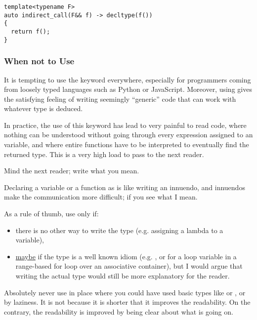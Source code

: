 \begin{lstlisting}
template<typename F>
auto indirect_call(F&& f) -> decltype(f())
{
  return f();
}
\end{lstlisting}

\subsubsection{When not to Use }

It is tempting to use the  keyword everywhere, especially
for programmers coming from loosely typed languages such as Python or
JavaScript. Moreover, using  gives the satisfying feeling
of writing seemingly ``generic'' code that can work with whatever type
is deduced.

In practice, the use of this keyword has lead to very painful to read
code, where nothing can be understood without going through every
expression assigned to an  variable, and where entire
functions have to be interpreted to eventually find the returned
type. This is a very high load to pass to the next reader.

\begin{guideline}
Mind the next reader; write what you mean.

Declaring a variable or a function as  is like writing an
innuendo, and innuendos make the communication more difficult; if you
see what I mean.

As a rule of thumb, use  only if:
\begin{itemize}
\item there is no other way to write the type (e.g. assigning a
  lambda to a variable),
\item \underline{maybe} if the type is a well known idiom (e.g. , or for a loop variable in a range-based for
  loop over an associative container), but I would argue that writing
  the actual type would still be more explanatory for the reader.
\end{itemize}

Absolutely never use  in place where you could have used
basic types like  or , or by laziness. It is not
because it is shorter that it improves the readability. On the
contrary, the readability is improved by being clear about what is
going on.
\end{guideline}
